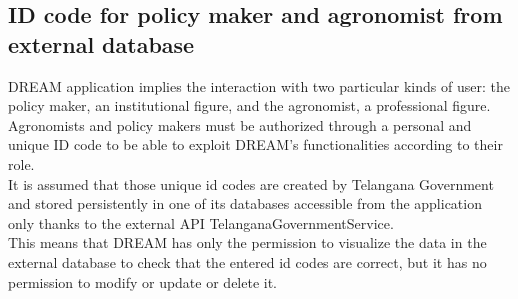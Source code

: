 
\subsection{ID code for policy maker and agronomist from external database}
DREAM application implies the interaction with two particular kinds of user: the policy maker, an institutional figure, and the agronomist, a professional figure. Agronomists and policy makers must be authorized through a personal and unique ID code to be able to exploit DREAM's functionalities according to their role. \\

It is assumed that those unique id codes are created by Telangana Government and stored persistently in one of its databases accessible from the application only thanks to the external API TelanganaGovernmentService.\\

This means that DREAM has only the permission to visualize the data in the external database to check that the entered id codes are correct, but it has no permission to modify or update or delete it.
